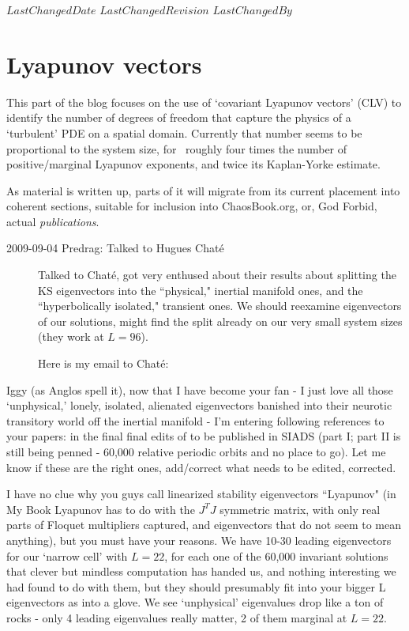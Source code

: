 {$LastChangedDate$}
{$LastChangedRevision$} {$LastChangedBy$}


\chapter{Lyapunov vectors}
\label{s:LyapunovVec}

This part of the blog focuses on the use of `covariant Lyapunov
vectors' (CLV) to identify the number of degrees of freedom
that capture the physics of a `turbulent' PDE on a spatial
domain. Currently that number seems to be proportional to the
system size, for \KSe\ roughly four times the number of
 positive/marginal Lyapunov exponents, and twice its
Kaplan-Yorke estimate.

As material is written up, parts of it will migrate from its
current placement into coherent sections, suitable for
inclusion into ChaosBook.org, or, God Forbid, actual {\em
publications}.

\begin{description}

\item[2009-09-04 Predrag: Talked to Hugues Chat\'{e}]
Talked to Chat\'{e}, got very
enthused about their results about splitting the KS
eigenvectors into the ``physical," inertial manifold ones,
and the ``hyperbolically isolated," transient ones. We should
reexamine eigenvectors of our solutions, might find the split
already on our very small system sizes (they work at $L=96$).

Here is my email to Chat\'{e}:

\end{description}

Iggy (as Anglos spell it),
%
now that I have become your fan - I just love all those
`unphysical,' lonely, isolated, alienated eigenvectors
banished into their neurotic transitory world off the
inertial manifold -  I'm entering following references to
your papers:
in the final final edits of to be published in SIADS (part I;
part II is still being penned - 60,000 relative periodic
orbits and no place to go). Let me know if these are the
right ones, add/correct what needs to be edited, corrected.

I have no clue why you guys call linearized stability
eigenvectors ``Lyapunov" (in My Book Lyapunov has to do with
the $J^T J$ symmetric matrix, with only real parts of Floquet
multipliers captured, and eigenvectors that do not seem to
mean anything), but you must have your reasons. We have 10-30
leading eigenvectors for our `narrow cell' with $L=22$, for
each one of the 60,000 invariant solutions that clever but
mindless computation has handed us, and nothing interesting
we had found to do with them, but they should presumably fit
into your bigger L eigenvectors as into a glove. We see
`unphysical' eigenvalues drop like a ton of rocks - only 4
leading eigenvalues really matter, 2 of them marginal at
$L=22$.

